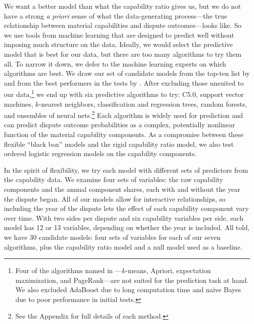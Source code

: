 We want a better model than what the capability ratio gives us, but we do not have a strong \emph{a priori} sense of what the data-generating process---the true relationship between material capabilities and dispute outcomes---looks like.
So we use tools from machine learning that are designed to predict well without imposing much structure on the data.
Ideally, we would select the predictive model that is best for our data, but there are too many algorithms to try them all.
To narrow it down, we defer to the machine learning experts on which algorithms are best.
We draw our set of candidate models from the top-ten list by \citet{Wu:2007ev} and from the best performers in the tests by \citet{FernandezDelgado:2014ul}.
After excluding those unsuited to our data,\footnote{%
  Four of the algorithms named in \citet{Wu:2007ev}---$k$-means, Apriori, expectation maximization, and PageRank---are not suited for the prediction task at hand.
  We also excluded AdaBoost due to long computation time and naive Bayes due to poor performance in initial tests.
}
we end up with six predictive algorithms to try: C5.0, support vector machines, $k$-nearest neighbors, classification and regression trees, random forests, and ensembles of neural nets.\footnote{%
  See the Appendix for full details of each method.
}
Each algorithm is widely used for prediction and can predict dispute outcome probabilities as a complex, potentially nonlinear function of the material capability components.
As a compromise between these flexible ``black box'' models and the rigid capability ratio model, we also test ordered logistic regression models on the capability components.

In the spirit of flexibility, we try each model with different sets of predictors from the capability data.
We examine four sets of variables: the raw capability components and the annual component shares, each with and without the year the dispute began.
All of our models allow for interactive relationships, so including the year of
the dispute lets the effect of each capability component vary over time.
With two sides per dispute and six capability variables per side, each model has 12 or 13 variables, depending on whether the year is included.
All told, we have 30 candidate models: four sets of variables for each of our seven algorithms, plus the capability ratio model and a null model used as a baseline.

